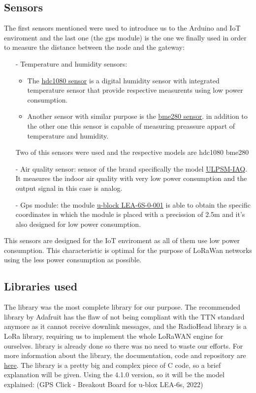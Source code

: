 \subsection{Sensors}
The first sensors mentioned were used to introduce us to the Arduino and IoT enviroment and the last one (the gps module)
is the one we finally used in order to measure the distance between the node and the gateway:
\begin{itemize}
    \item[-] Temperature and humidity sensors: 
        \begin{itemize}
        \item The \href{https://www.ti.com/lit/ds/symlink/hdc1080.pdf?ts=1655758883138&ref_url=https%253A%252F%252Fwww.google.com%252F}{hdc1080 sensor}
        is a digital humidity sensor with integrated temperature sensor that provide respective measurents using low power consumption.
        \item Another sensor with similar purpose is the \href{https://cdn-learn.adafruit.com/downloads/pdf/adafruit-bme280-humidity-barometric-pressure-temperature-sensor-breakout.pdf}{bme280 sensor}.
        in addition to the other one this sensor is capable of measuring preassure appart of temperature and humidity. 
        \end{itemize} 
        Two of this sensors were used and the respective models are hdc1080 bme280
    \item[-] Air quality sensor: sensor of the brand  specifically the model \href{https://www.spec-sensors.com/wp-content/uploads/2016/10/ULPSM-IAQ-968-008.pdf}{ULPSM-IAQ}. It measures the indoor air quality   with very low power consumption and the output signal in this case is analog.
    \item[-] Gps module: the module \href{https://www.u-blox.com/en/product/lea-6-series}{u-block LEA-6S-0-001} is able to obtain the specific coordinates in which the module is placed with a precission of 2.5m and it's also designed for low power consumption.
\end{itemize} 
This sensors are designed for the IoT enviroment as all of them use low power consumption. This characteristic is optimal for the purpose of LoRaWan networks using the less power consumption as possible. 
\subsection{Libraries used}
\label{sec:s-m-libra}
The  library was the most complete library for
our purpose. The recommended library by Adafruit has the flaw of not
being compliant with the TTN standard anymore as it cannot receive
downlink messages, and the RadioHead library is a LoRa library,
requiring us to implement the whole LoRaWAN engine for ourselves.
 library is already done so there was no need to
waste our efforts. For more information about the library, the
documentation, code and repository are 
\href{https://github.com/mcci-catena/arduino-lmic.}{here}. The library is a pretty big and complex piece of C code, so a brief
explanation will be given.
Using the 4.1.0 version, so it will be the model explained:
(GPS Click - Breakout Board for u-blox LEA-6s, 2022)

